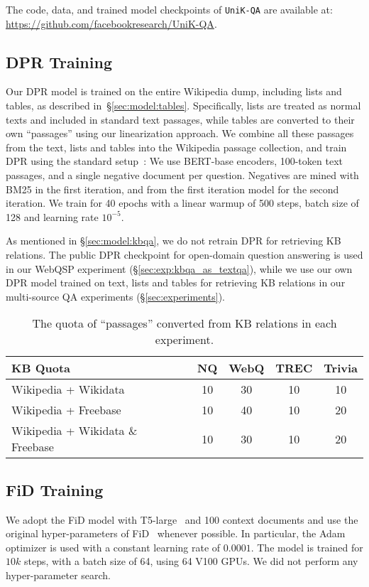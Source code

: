 \documentclass[11pt]{article}
\newcommand{\uniqa}{\texttt{UniK-QA}\xspace}
\newcommand{\secref}[1]{\S\ref{#1}}
\begin{document}
The code, data, and trained model checkpoints of \uniqa{} are available at: \url{https://github.com/facebookresearch/UniK-QA}.
\subsection{DPR Training}\label{sec:implementation:dpr}
Our DPR model is trained on the entire Wikipedia dump, including lists and tables, as described in~\secref{sec:model:tables}.
Specifically, lists are treated as normal texts and included in standard text passages, while tables are converted to their own ``passages'' using our linearization approach.
We combine all these passages from the text, lists and tables into the Wikipedia passage collection, and train DPR using the standard setup~\cite{DPR}: We use BERT-base \citep{BERT} encoders, 100-token text passages, and a single negative document per question.  Negatives are mined with BM25 in the first iteration, and from the first iteration model for the second iteration.  We train for 40 epochs with a linear warmup of 500 steps, batch size of 128 and learning rate $10^{-5}$.

As mentioned in \secref{sec:model:kbqa}, we do not retrain DPR for retrieving KB relations.
The public DPR checkpoint for open-domain question answering is used in our WebQSP experiment (\secref{sec:exp:kbqa_as_textqa}), while we use our own DPR model trained on text, lists and tables for retrieving KB relations in our multi-source QA experiments (\secref{sec:experiments}).

\begin{table*}[ht]
    \centering
    \begin{tabular}{l c c c c c}
    \toprule
    KB Quota && NQ & WebQ & TREC & Trivia \\
    \midrule
    Wikipedia + Wikidata && 10 & 30 & 10 & 10 \\
    Wikipedia + Freebase && 10 & 40 & 10 & 20 \\
    Wikipedia + Wikidata \& Freebase && 10 & 30 & 10 & 20 \\
    \bottomrule
    \end{tabular}
    \caption{The quota of ``passages'' converted from KB relations in each experiment.}
    \label{tab:kb_quota}
\end{table*} 
\subsection{FiD Training}\label{sec:implementation:fid}
We adopt the FiD model with T5-large~\cite{t5} and 100 context documents and use the original hyper-parameters of FiD~\cite{izacard-grave-2021-leveraging} whenever possible.
In particular, the Adam~\cite{kingma2014adam} optimizer is used with a constant learning rate of $0.0001$.
The model is trained for $10k$ steps, with a batch size of 64, using 64 V100 GPUs.
We did not perform any hyper-parameter search.
\end{document}
